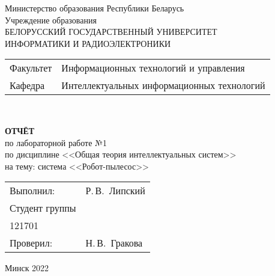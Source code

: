 \begin{titlepage}
  \begin{center}
    Министерство образования Республики Беларусь\\[1em]
    Учреждение образования\\
    БЕЛОРУССКИЙ ГОСУДАРСТВЕННЫЙ УНИВЕРСИТЕТ \\
    ИНФОРМАТИКИ И РАДИОЭЛЕКТРОНИКИ\\[1em]

    \begin{minipage}{\textwidth}
      \begin{flushleft}
        \begin{tabular}{ l l }
          Факультет & Информационных технологий и управления\\
          Кафедра   & Интеллектуальных информационных технологий
        \end{tabular}
      \end{flushleft}
    \end{minipage}\\[1em]

    \vspace{5em}


    \textbf{ОТЧЁТ}\\
    {по лабораторной работе №1}\\
    {по дисциплине <<Общая теория интеллектуальных систем>>}\\
    {на тему: система <<Робот-пылесос>>}
    \vspace{10em}
    
    \begin{tabular}{ p{}p{} }
      Выполнил:& Р.\,В.~Липский \\[1em]
      Студент группы& \\
      121701 & \\
      Проверил: & Н.\,В.~Гракова \\
     
    \end{tabular}
    
    \vfill
    {\normalsize Минск 2022}
  \end{center}
\end{titlepage}
